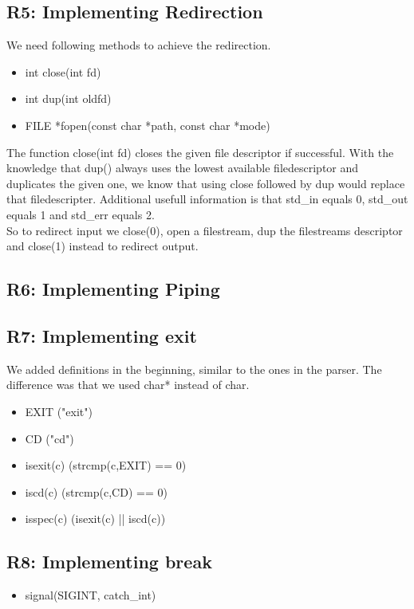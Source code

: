 \subsection{R5: Implementing Redirection}
We need following methods to achieve the redirection.
\begin{itemize}
\item int close(int fd)
\item int dup(int oldfd)
\item FILE *fopen(const char *path, const char *mode)
\end{itemize}
The function close(int fd) closes the given file descriptor if successful. With the knowledge that dup() always uses the lowest available filedescriptor and duplicates the given one, we know that using close followed by dup would replace that filedescripter.
Additional usefull information is that std\_in equals 0, std\_out equals 1 and std\_err equals 2.\\
So to  redirect input we close(0), open a filestream, dup the filestreams descriptor and close(1) instead to redirect output.

\subsection{R6: Implementing Piping}

\subsection{R7: Implementing exit}
We added definitions in the beginning, similar to the ones in the parser. The difference was that we used char* instead of char.
\begin{itemize}
\item EXIT	("exit")
\item CD      ("cd")
\item isexit(c) (strcmp(c,EXIT) == 0)
\item iscd(c) (strcmp(c,CD) == 0)
\item isspec(c) (isexit(c) || iscd(c))
\end{itemize}


\subsection{R8: Implementing break}
\begin{itemize}
\item signal(SIGINT, catch\_int)
\end{itemize}

